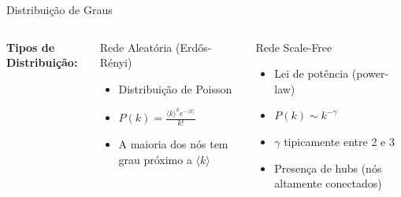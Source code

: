 \begin{frame}[shrink=10]{Distribuição de Graus}

\vspace{0.3cm}

\begin{columns}
\textbf{Tipos de Distribuição:}

\begin{exampleblock}{Rede Aleatória (Erdős-Rényi)}
\begin{itemize}
    \item Distribuição de Poisson
    \item $P(k) = \frac{\langle k \rangle^k e^{-\langle k \rangle}}{k!}$
    \item A maioria dos nós tem grau próximo a $\langle k \rangle$
\end{itemize}
\end{exampleblock}

\begin{exampleblock}{Rede Scale-Free}
\begin{itemize}
    \item Lei de potência (power-law)
    \item $P(k) \sim k^{-\gamma}$
    \item $\gamma$ tipicamente entre 2 e 3
    \item Presença de hubs (nós altamente conectados)
\end{itemize}
\end{exampleblock}
\end{columns}

\vspace{0.3cm}

\end{frame}

